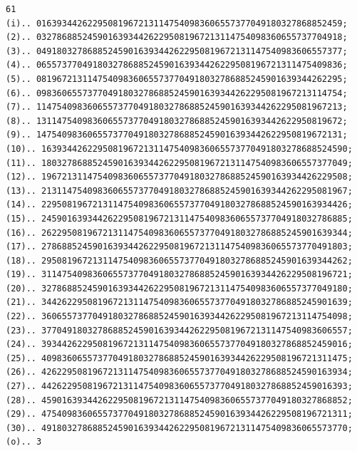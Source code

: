 \documentclass[10pt,a4paper]{article}
\begin{document}
\newpage
\setcounter{page}{419}

\begin{verbatim}
61
(i).. 016393442622950819672131147540983606557377049180327868852459;
(2).. 032786885245901639344262295081967213114754098360655737704918;
(3).. 049180327868852459016393442622950819672131147540983606557377;
(4).. 065573770491803278688524590163934426229508196721311475409836;
(5).. 081967213114754098360655737704918032786885245901639344262295;
(6).. 098360655737704918032786885245901639344262295081967213114754;
(7).. 114754098360655737704918032786885245901639344262295081967213;
(8).. 131147540983606557377049180327868852459016393442622950819672;
(9).. 147540983606557377049180327868852459016393442622950819672131;
(10).. 163934426229508196721311475409836065573770491803278688524590;
(11).. 180327868852459016393442622950819672131147540983606557377049;
(12).. 196721311475409836065573770491803278688524590163934426229508;
(13).. 213114754098360655737704918032786885245901639344262295081967;
(14).. 229508196721311475409836065573770491803278688524590163934426;
(15).. 245901639344262295081967213114754098360655737704918032786885;
(16).. 262295081967213114754098360655737704918032786885245901639344;
(17).. 278688524590163934426229508196721311475409836065573770491803;
(18).. 295081967213114754098360655737704918032786885245901639344262;
(19).. 311475409836065573770491803278688524590163934426229508196721;
(20).. 327868852459016393442622950819672131147540983606557377049180;
(21).. 344262295081967213114754098360655737704918032786885245901639;
(22).. 360655737704918032786885245901639344262295081967213114754098;
(23).. 377049180327868852459016393442622950819672131147540983606557;
(24).. 393442622950819672131147540983606557377049180327868852459016;
(25).. 409836065573770491803278688524590163934426229508196721311475;
(26).. 426229508196721311475409836065573770491803278688524590163934;
(27).. 442622950819672131147540983606557377049180327868852459016393;
(28).. 459016393442622950819672131147540983606557377049180327868852;
(29).. 475409836065573770491803278688524590163934426229508196721311;
(30).. 491803278688524590163934426229508196721311475409836065573770;
(o).. 3
\end{verbatim}

\newpage
\setcounter{page}{420}
\end{document}
